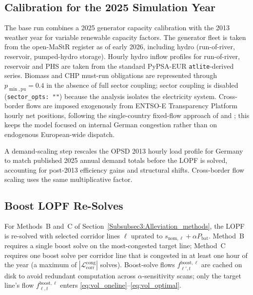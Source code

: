 \subsection{Calibration for the 2025 Simulation Year}
 
The base run combines a 2025 generator capacity calibration with the 2013 weather year for variable renewable capacity factors. The generator fleet is taken from the open-MaStR register \citep{MaStR_2025_open_register} as of early 2026, including hydro (run-of-river, reservoir, pumped-hydro storage). Hourly hydro inflow profiles for run-of-river, reservoir and PHS are taken from the standard PyPSA-EUR \texttt{atlite}-derived series. Biomass and CHP must-run obligations are represented through $p_{\min,\mathrm{pu}} = 0.4$ in the absence of full sector coupling; sector coupling is disabled (\texttt{sector\_opts: ""}) because the analysis isolates the electricity system. Cross-border flows are imposed exogenously from ENTSO-E Transparency Platform hourly net positions, following the single-country fixed-flow approach of \citet{Frysztacki_2021_Network_Resolution_VRE} and \citet{Thomassen_2024_Redispatch_and_Congestion_Management_Forecast}; this keeps the model focused on internal German congestion rather than on endogenous European-wide dispatch.
 
A demand-scaling step rescales the OPSD 2013 hourly load profile for Germany to match published 2025 annual demand totals before the LOPF is solved, accounting for post-2013 efficiency gains and structural shifts. Cross-border flow scaling uses the same multiplicative factor.
 
\subsection{Boost LOPF Re-Solves}
 
For Methods~B and~C of Section~\ref{Subsubsec3:Alleviation_methods}, the LOPF is re-solved with selected corridor lines $\ell$ uprated to $s_{\mathrm{nom},\ell} + \alpha P_{\mathrm{bat}}$. Method~B requires a single boost solve on the most-congested target line; Method~C requires one boost solve per corridor line that is congested in at least one hour of the year (a maximum of $|\mathcal{L}_{\mathrm{corr}}^{\mathrm{cong}}|$ solves). Boost-solve flows $f^{\mathrm{boost},\ell}_{\ell',t}$ are cached on disk to avoid redundant computation across $\alpha$-sensitivity scans; only the target line's flow $f^{\mathrm{boost},\ell}_{\ell,t}$ enters \eqref{eq:vol_oneline}--\eqref{eq:vol_optimal}.
 